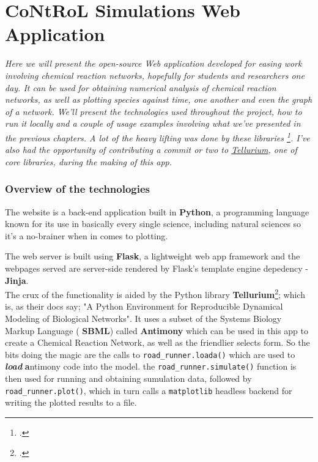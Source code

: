 \chapter{CoNtRoL Simulations Web Application}
\label{ch:web-app}

\textit{ Here we will present the open-source Web application developed for easing work involving chemical reaction networks, hopefully for students and researchers one day. It can be used for obtaining numerical analysis of chemical reaction networks, as well as plotting species against time, one another and even the graph of a network. We'll present the technologies used throughout the project, how to run it locally and a couple of usage examples involving what we've presented in the previous chapters. A lot of the heavy lifting was done by these libraries \footcite{10.1093/bioinformatics/btac730, xu2023SbmlDiagrams, medley2018tellurium, choi2018Tellurium}. I've also had the opportunity of contributing a commit or two to \href{https://github.com/sys-bio/tellurium}{Tellurium}, one of core libraries, during the making of this app.}

\subsection{Overview of the technologies}
The website is a back-end application built in \textbf{Python}, a programming language known for its use in basically every single science, including natural sciences so it's a no-brainer when in comes to plotting.

The web server is built using \textbf{Flask}, a lightweight web app framework and the webpages served are server-side rendered by Flask's template engine depedency - \textbf{Jinja}.
\\
The crux of the functionality is aided by the Python library \textbf{Tellurium}\footcite{choi2018Tellurium,medley2018tellurium}; which is, as their docs say; "A Python Environment for Reproducible Dynamical Modeling of Biological Networks". It uses a subset of the Systems Biology Markup Language ( \textbf{SBML})\cite{xu2023SbmlDiagrams} called \textbf{Antimony} which can be used in this app to create a Chemical Reaction Network, as well as the friendlier selects form. So the bits doing the magic are the calls to \verb|road_runner.loada()| which are used to \textbf{\textit{load}}    \textbf{a}ntimony code into the model.
the \verb|road_runner.simulate()| function is then used for running and obtaining sumulation data, followed by \verb|road_runner.plot()|, which in turn calls a \verb|matplotlib| headless backend for writing the plotted results to a file.

